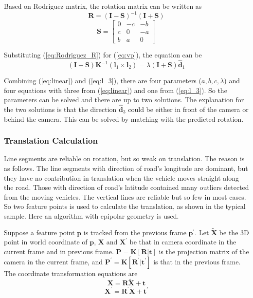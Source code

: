 \documentclass[letterpaper, 10 pt, conference]{ieeeconf}  %
\begin{document}
Based on Rodriguez matrix, the rotation matrix can be written as
\begin{equation}
\mathbf{R}=\left(\mathbf{I}-\mathbf{S}\right)^{-1}\left(\mathbf{I}+\mathbf{S}\right)
\label{eq:Rodriguez_R}
\end{equation}
\begin{equation}
\mathbf{S}=\begin{bmatrix}      0 & -c & -b \\
                                c & 0 & -a \\
                                b & a & 0
                    \end{bmatrix}
\label{eq:Rodriguez_S}
\end{equation}

Substituting (\ref{eq:Rodriguez_R}) for (\ref{eq:vp}), the equation can be
\begin{equation}
(\mathbf{I}-\mathbf{S})\mathbf{K}^{-1}(\mathbf{l}_1\times \mathbf{l}_2)
= \lambda (\mathbf{I}+\mathbf{S})\hat{\mathbf{d}}_1
\label{eq:linear}
\end{equation}

Combining (\ref{eq:linear}) and (\ref{eq:l_3}), there are four parameters ($a,b,c,\lambda$) and four equations with three from (\ref{eq:linear}) and one from (\ref{eq:l_3}). So the parameters can be solved and there are up to two solutions. The explanation for the two solutions is that the direction $\hat{\mathbf{d}}_3$ could be either in front of the camera or behind the camera. This can be solved by matching with the predicted rotation.

\subsubsection{Translation Calculation}
Line segments are reliable on rotation, but so weak on translation. The reason is as follows. The line segments with direction of road's longitude are dominant, but they have no contribution in translation when the vehicle moves straight along the road. Those with direction of road's latitude contained many outliers detected from the moving vehicles. The vertical lines are reliable but so few in most cases. So two feature points is used to calculate the translation, as shown in the typical sample. Here an algorithm with epipolar geometry is used.

Suppose a feature point $\mathbf{p}$ is tracked from the previous frame $\mathbf{p}^\prime$. Let $\widetilde{\mathbf{X}}$ be the 3D point in world coordinate of $\mathbf{p}$, $\mathbf{X}$ and $\mathbf{X}^\prime$ be that in camera coordinate in the current frame and in previous frame. $\mathbf{P}=\mathbf{K}[\mathbf{R}|\mathbf{t}]$ is the projection matrix of the camera in the current frame, and $\mathbf{P}^\prime=\mathbf{K}[\mathbf{R}^\prime|\mathbf{t}^\prime]$ is that in the previous frame. The coordinate transformation equations are
\begin{equation}
\mathbf{X}    =\mathbf{R}       \widetilde{\mathbf{X}}+\mathbf{t}
\end{equation}
\begin{equation}
\mathbf{X}^\prime=\mathbf{R}^\prime   \widetilde{\mathbf{X}}+\mathbf{t}^\prime
\end{equation}
\end{document}

